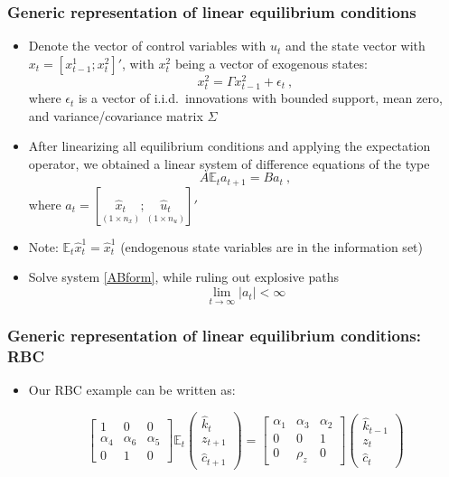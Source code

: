 \documentclass[handout,usepdftitle=false,xcolor=dvipsnames,aspectratio=169]{beamer}
\begin{document}
\begin{frame}
\frametitle{Generic representation of linear equilibrium conditions}
\begin{itemize}
\item Denote the vector of control variables with $u_t$ and the state vector with $x_t = [x_{t-1}^1; x_t^2]'$, with $x_t^2$ being a vector of exogenous states:
\begin{equation}\label{eq: shocks}
    x_{t}^2 = \Gamma x_{t-1}^2 + \epsilon_{t} \: ,
\end{equation}
where $\epsilon_t$ is a vector of i.i.d.\ innovations with bounded support, mean zero, and variance/covariance matrix $\Sigma$
\item After linearizing all equilibrium conditions and applying the expectation operator, we obtained a linear system of difference equations of the type
    \begin{equation}\label{ABform}
        A\mathbb{E}_t a_{t+1} = B a_t \: ,
    \end{equation}
where $a_t = \left[ \underset{(1 \times n_x )}{\widehat{x}_t}; \underset{(1 \times n_u)}{\widehat{u}_t} \right]'$
\item Note: $\mathbb{E}_t \widehat{x}^1_{t} = \widehat{x}^1_{t}$ (endogenous state variables are in the information set)
\item Solve system \eqref{ABform}, while ruling out explosive paths
\begin{equation}\label{stability}
    \lim_{t\rightarrow \infty} | a_t | < \infty
\end{equation}
\end{itemize}
\end{frame}


\begin{frame}
\frametitle{Generic representation of linear equilibrium conditions: RBC}
\begin{itemize}
\item Our RBC example can be written as:

\[\left[ {\begin{array}{*{20}{c}}
  1&0&0 \\
  {{\alpha _4}}&{{\alpha _6}}&{{\alpha _5}} \\
  0&1&0
\end{array}} \right]{\mathbb{E}_t}\left( {\begin{array}{*{20}{c}}
  {\hat k_{t}} \\
  {{z_{t + 1}}} \\
  {\hat c_{t + 1}}
\end{array}} \right) = \left[ {\begin{array}{*{20}{c}}
  {{\alpha _1}}&{{\alpha _3}}&{{\alpha _2}} \\
  0&0&1 \\
  0&{{\rho _z}}&0
\end{array}} \right]\left( {\begin{array}{*{20}{c}}
  {\hat k_{t-1}} \\
  {{z_t}} \\
  {\hat c_t}
\end{array}} \right)\]
\end{itemize}
\end{frame}
\end{document}
